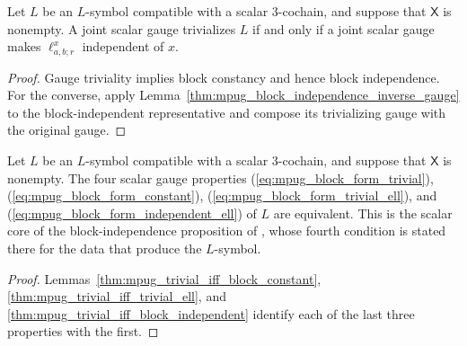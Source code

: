 \begin{lemma}
    \label{thm:mpug_trivial_iff_block_independent}
    \leanok
    Let $L$ be an $L$-symbol compatible with a scalar $3$-cochain,
    and suppose that $\mathsf X$ is nonempty. A joint scalar gauge trivializes
    $L$ if and only if a joint scalar gauge makes $\ell^x_{a,b;r}$ independent
    of $x$.
\end{lemma}
\begin{proof}\leanok
    Gauge triviality implies block constancy and hence block independence.
    For the converse, apply
    Lemma~\ref{thm:mpug_block_independence_inverse_gauge} to the
    block-independent representative and compose its trivializing gauge with
    the original gauge.
\end{proof}

\begin{lemma}
    \label{thm:mpug_block_independence_four_forms}
    \leanok
    Let $L$ be an $L$-symbol compatible with a scalar $3$-cochain,
    and suppose that $\mathsf X$ is nonempty. The four scalar gauge
    properties (\ref{eq:mpug_block_form_trivial}),
    (\ref{eq:mpug_block_form_constant}),
    (\ref{eq:mpug_block_form_trivial_ell}), and
    (\ref{eq:mpug_block_form_independent_ell}) of $L$ are equivalent. This is
    the scalar core of the block-independence proposition of
    \cite{FrancoRubio2025MPUGauging}, whose fourth condition is stated there
    for the data that produce the $L$-symbol.
\end{lemma}
\begin{proof}\leanok
    Lemmas~\ref{thm:mpug_trivial_iff_block_constant},
    \ref{thm:mpug_trivial_iff_trivial_ell}, and
    \ref{thm:mpug_trivial_iff_block_independent} identify each of the last
    three properties with the first.
\end{proof}
